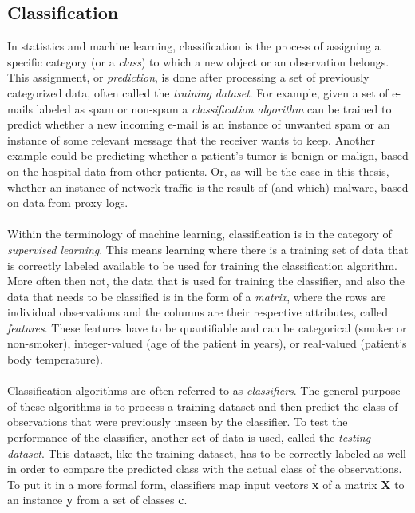 \documentclass[11pt]{article}
\begin{document}
    \subsection{Classification}
      In statistics and machine learning, classification is the process of assigning a specific category (or a {\it class}) to which a new object or an observation belongs. This assignment, or {\it prediction}, is done after processing a set of previously categorized data, often called the {\it training dataset}. For example, given a set of e-mails labeled as spam or non-spam a {\it classification algorithm} can be trained to predict whether a new incoming e-mail is an instance of unwanted spam or an instance of some relevant message that the receiver wants to keep. Another example could be predicting whether a patient's tumor is benign or malign, based on the hospital data from other patients. Or, as will be the case in this thesis, whether an instance of network traffic is the result of (and which) malware, based on data from proxy logs.
      \\~\\
      Within the terminology of machine learning, classification is in the category of {\it supervised learning}. \citep{mlintro} This means learning where there is a training set of data that is correctly labeled available to be used for training the classification algorithm. More often then not, the data that is used for training the classifier, and also the data that needs to be classified is in the form of a {\it matrix}, where the rows are individual observations and the columns are their respective attributes, called {\it features}. These features have to be quantifiable and can be categorical (smoker or non-smoker), integer-valued (age of the patient in years), or real-valued (patient's body temperature).
      \\~\\
      Classification algorithms are often referred to as {\it classifiers}. The general purpose of these algorithms is to process a training dataset and then predict the class of observations that were previously unseen by the classifier. To test the performance of the classifier, another set of data is used, called the {\it testing dataset}. This dataset, like the training dataset, has to be correctly labeled as well in order to compare the predicted class with the actual class of the observations.
      \\
      To put it in a more formal form, classifiers map input vectors {\bf x} of a matrix {\bf X} to an instance {\bf y} from a set of classes {\bf c}.
\end{document}
